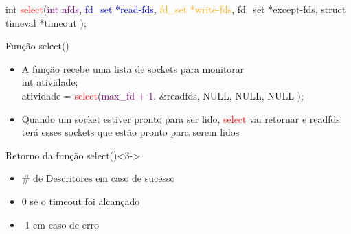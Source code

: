 \documentclass[10pt, xcolor=x11names]{beamer}
\begin{document}
\begin{frame}

int \textcolor{red}{select}(\textcolor{purple}{int nfds}, \textcolor{blue}{fd\_set *read-fds}, \textcolor{orange}{fd\_set *write-fds}, \textcolor[rgb]{.75,.48,0}{fd\_set *except-fds}, \textcolor[rgb]{.74,.01,.61}{struct timeval *timeout} );
	\begin{block}{Função select()}
	
		\begin{itemize}[<+->]
			\item A função recebe uma lista de sockets para monitorar \\
			\textcolor[rgb]{.68,.63,.03}{int atividade;\\
			atividade = }\textcolor{red}{select}(\textcolor{purple}{max\_fd + 1}, \textcolor[rgb]{.01,.3,.0}{\&readfds}, NULL, NULL, NULL );\\

			\item Quando um socket estiver pronto para ser lido, \textcolor{red}{select} vai retornar e \textcolor[rgb]{.01,.3,.0}{readfds} terá esses sockets que estão pronto para serem lidos
		\end{itemize}

	\end{block}

	\begin{block}{Retorno da função select()}<3->
	
		\begin{itemize}
			\item \# de Descritores em caso de sucesso
			\item 0 se o timeout foi alcançado
			\item -1 em caso de erro
		\end{itemize}

	\end{block}
	
\end{frame}

\end{document}

